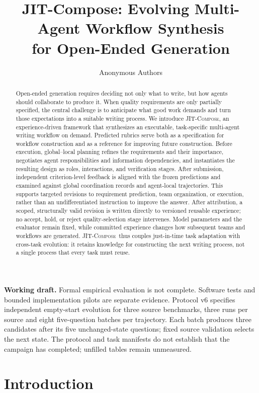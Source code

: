 \documentclass[11pt]{article}
\title{JIT-Compose: Evolving Multi-Agent Workflow Synthesis\\for Open-Ended Generation}
\author{Anonymous Authors}
\date{}
\newcommand{\method}{\mbox{\textsc{JIT-Compose}}}
\begin{document}
\maketitle

\begin{abstract}
Open-ended generation requires deciding not only what to write, but how agents should collaborate to produce it. When quality requirements are only partially specified, the central challenge is to anticipate what good work demands and turn those expectations into a suitable writing process. We introduce \method, an experience-driven framework that synthesizes an executable, task-specific multi-agent writing workflow on demand. Predicted rubrics serve both as a specification for workflow construction and as a reference for improving future construction. Before execution, global--local planning refines the requirements and their importance, negotiates agent responsibilities and information dependencies, and instantiates the resulting design as roles, interactions, and verification stages. After submission, independent criterion-level feedback is aligned with the frozen predictions and examined against global coordination records and agent-local trajectories. This supports targeted revisions to requirement prediction, team organization, or execution, rather than an undifferentiated instruction to improve the answer. After attribution, a scoped, structurally valid revision is written directly to versioned reusable experience; no accept, hold, or reject quality-selection stage intervenes. Model parameters and the evaluator remain fixed, while committed experience changes how subsequent teams and workflows are generated. \method\ thus couples just-in-time task adaptation with cross-task evolution: it retains knowledge for constructing the next writing process, not a single process that every task must reuse.
\end{abstract}

\noindent\textbf{Working draft.} Formal empirical evaluation is not complete. Software tests and bounded implementation pilots are separate evidence. Protocol v6 specifies independent empty-start evolution for three source benchmarks, three runs per source and eight five-question batches per trajectory. Each batch produces three candidates after its five unchanged-state questions; fixed source validation selects the next state. The protocol and task manifests do not establish that the campaign has completed; unfilled tables remain unmeasured.

\section{Introduction}
\label{sec:intro}
\end{document}

